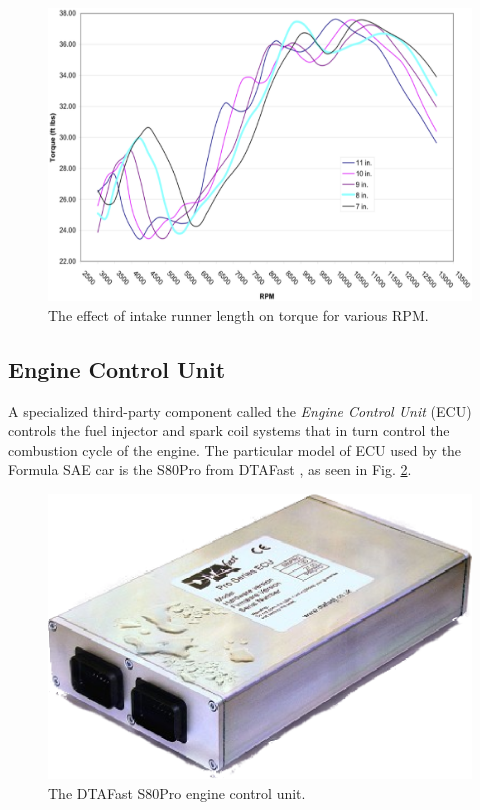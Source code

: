 \begin{figure}[H]
	\centering
	 	\includegraphics[scale=0.35]{background/figures/irl_effect.eps}
    \caption{The effect of intake runner length on torque for various RPM.}
    \label{fig:irl_effect}
\end{figure}

\subsection{Engine Control Unit}
\label{sec:ECU}


A specialized third-party component called the \emph{Engine Control Unit} (ECU) controls the fuel injector and spark coil systems that in turn control the combustion cycle of the engine. The particular model of ECU used by the Formula SAE car is the S80Pro from DTAFast \cite{s80pro}, as seen in Fig. \ref{fig:s80pro_product}.

\begin{figure}[H]
	\centering
		\includegraphics[scale=0.5]{background/figures/s80.eps}
	\caption{The DTAFast S80Pro engine control unit.}
	\label{fig:s80pro_product}
\end{figure}

